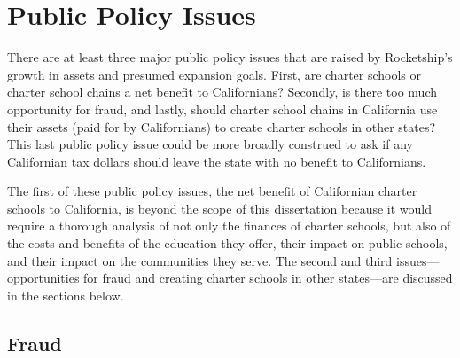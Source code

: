 \section{Public Policy Issues}%
\label{sec:publ-policy-chang}\indent%

There are at least three major public policy issues that are raised by Rocketship's growth in assets and presumed expansion goals. First, are charter schools or charter school chains a net benefit to Californians? Secondly, is there too much opportunity for fraud, and lastly, should charter school chains in California use their assets (paid for by Californians) to create charter schools in other states? This last public policy issue could be more broadly construed to ask if any Californian tax dollars should leave the state with no benefit to Californians.

The first of these public policy issues, the net benefit of Californian charter schools to California, is beyond the scope of this dissertation because it would require a thorough analysis of not only the finances of charter schools, but also of the costs and benefits of the education they offer, their impact on public schools, and their impact on the communities they serve. The second and third issues—opportunities for fraud and creating charter schools in other states—are discussed in the sections below.

\subsection{Fraud}%
\label{sec:fraud}\indent%

